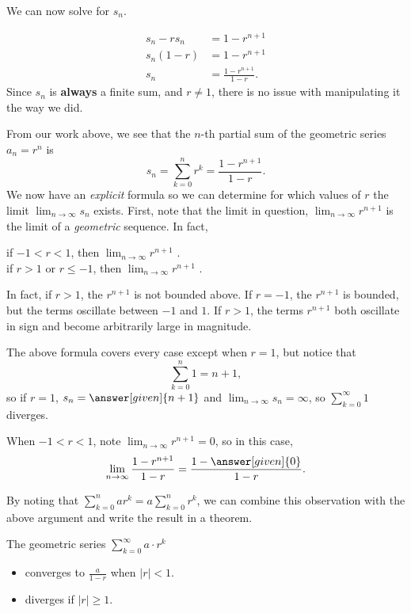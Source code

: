 \documentclass{ximera}
\begin{document}
\begin{example}
\begin{explanation}
 We can now solve for $s_n$.
 
     \begin{align*}
      s_n - r s_n &= 1 - r^{n+1}\\
      s_n(1-r)    &= 1 - r^{n+1}\\
      s_n &= \frac{1 - r^{n+1}}{1-r}.
    \end{align*}
    Since $s_n$ is \textbf{always} a finite sum, and $r \ne 1$, there is no issue
    with manipulating it the way we did.
  \end{explanation}
\end{example}

From our work above, we see that the $n$-th partial sum of the
geometric series $a_n = r^n$ is
\[
s_n = \sum_{k=0}^{n} r^k= \frac{1 - r^{n+1}}{1-r}.
\]
We now have an \emph{explicit} formula so we can determine for which values of $r$ the limit $\lim_{n \to \infty} s_n$ exists.  First, note that the limit in question, $\lim_{n \to \infty} r^{n+1}$ is the limit of a \emph{geometric} sequence.  In fact, 

\begin{itemize}
if $-1<r<1$, then $\lim_{n \to \infty} r^{n+1}$ . \\ [2 ex] 
if $r>1$ or $r\le -1$, then $\lim_{n \to \infty} r^{n+1}$ .
\end{itemize}

In fact, if $r>1$, the $r^{n+1}$ is not bounded above.  If $r=-1$, the $r^{n+1}$ is bounded, but the terms oscillate between $-1$ and $1$.  If $r>1$, the terms $r^{n+1}$ both oscillate in sign and become arbitrarily large in magnitude.

The above formula covers every case except when $r= 1$, but notice that  $$\sum_{k=0}^n 1 = n+1,$$ so if $r=1$, $s_n = \answer[given]{n+1}$ and $\lim_{n \to \infty} s_n = \infty$, so $\sum_{k=0}^{\infty} 1$ diverges. 

When $-1<r<1$, note $\lim_{n \to \infty} r^{n+1}=0$, so in this case,     \[
    \lim_{n\to\infty}\frac{1 - r^{n+1}}{1-r} = \frac{1-\answer[given]{0}}{1-r}.
    \]

By noting that $\sum_{k=0}^n ar^k = a \sum_{k=0}^n r^k$, we can combine this observation with the above argument and write the result in a theorem.

\begin{theorem}
  The geometric series $\sum_{k= 0}^\infty a \cdot r^k$ 
  
  \begin{itemize} 
  \item converges to $\frac{a}{1-r}$ when $|r| < 1$.
  \item diverges if $|r| \geq 1$.  
  \end{itemize}
  \end{theorem}
\end{document}
